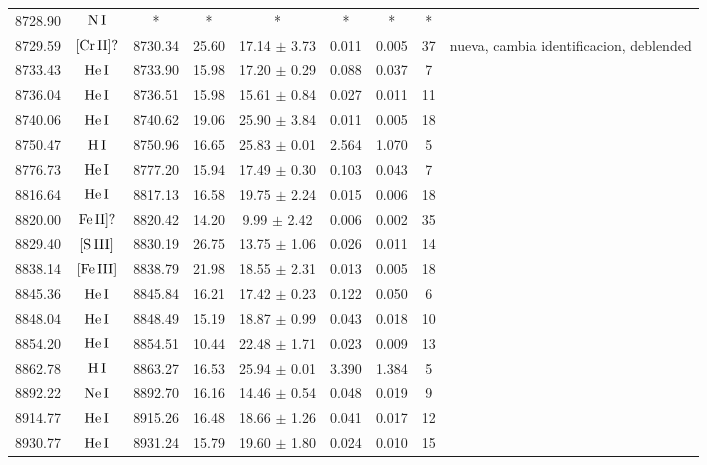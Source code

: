 \documentclass{article}
\begin{document}
\begin{table*}
\begin{adjustbox}{width=\textwidth}
\begin{tabular}{ccccccccc}
8728.90 & $\mbox{N}\thinspace \mbox{I}$ & * & * & * & * & * & * &  \\
8729.59 & $\mbox{[Cr}\thinspace \mbox{II]?}$ & 8730.34 & 25.60 & 17.14 $\pm$ 3.73 & 0.011 & 0.005 & 37 &  nueva, cambia identificacion, deblended \\
8733.43 & $\mbox{He}\thinspace \mbox{I}$ & 8733.90 & 15.98 & 17.20 $\pm$ 0.29 & 0.088 & 0.037 & 7 &  \\
8736.04 & $\mbox{He}\thinspace \mbox{I}$ & 8736.51 & 15.98 & 15.61 $\pm$ 0.84 & 0.027 & 0.011 & 11 &  \\
8740.06 & $\mbox{He}\thinspace \mbox{I}$ & 8740.62 & 19.06 & 25.90 $\pm$ 3.84 & 0.011 & 0.005 & 18 &  \\
8750.47 & $\mbox{H}\thinspace \mbox{I}$ & 8750.96 & 16.65 & 25.83 $\pm$ 0.01 & 2.564 & 1.070 & 5 &  \\
8776.73 & $\mbox{He}\thinspace \mbox{I}$ & 8777.20 & 15.94 & 17.49 $\pm$ 0.30 & 0.103 & 0.043 & 7 &  \\
8816.64 & $\mbox{He}\thinspace \mbox{I}$ & 8817.13 & 16.58 & 19.75 $\pm$ 2.24 & 0.015 & 0.006 & 18 &  \\
8820.00 & $\mbox{Fe}\thinspace \mbox{II]?}$ & 8820.42 & 14.20 & 9.99 $\pm$ 2.42 & 0.006 & 0.002 & 35 &  \\
8829.40 & $\mbox{[S}\thinspace \mbox{III]}$ & 8830.19 & 26.75 & 13.75 $\pm$ 1.06 & 0.026 & 0.011 & 14 &  \\
8838.14 & $\mbox{[Fe}\thinspace \mbox{III]}$ & 8838.79 & 21.98 & 18.55 $\pm$ 2.31 & 0.013 & 0.005 & 18 &  \\
8845.36 & $\mbox{He}\thinspace \mbox{I}$ & 8845.84 & 16.21 & 17.42 $\pm$ 0.23 & 0.122 & 0.050 & 6 &  \\
8848.04 & $\mbox{He}\thinspace \mbox{I}$ & 8848.49 & 15.19 & 18.87 $\pm$ 0.99 & 0.043 & 0.018 & 10 &  \\
8854.20 & $\mbox{He}\thinspace \mbox{I}$ & 8854.51 & 10.44 & 22.48 $\pm$ 1.71 & 0.023 & 0.009 & 13 &  \\
8862.78 & $\mbox{H}\thinspace \mbox{I}$ & 8863.27 & 16.53 & 25.94 $\pm$ 0.01 & 3.390 & 1.384 & 5 &  \\
8892.22 & $\mbox{Ne}\thinspace \mbox{I}$ & 8892.70 & 16.16 & 14.46 $\pm$ 0.54 & 0.048 & 0.019 & 9 &  \\
8914.77 & $\mbox{He}\thinspace \mbox{I}$ & 8915.26 & 16.48 & 18.66 $\pm$ 1.26 & 0.041 & 0.017 & 12 &  \\
8930.77 & $\mbox{He}\thinspace \mbox{I}$ & 8931.24 & 15.79 & 19.60 $\pm$ 1.80 & 0.024 & 0.010 & 15 &  \\

\end{tabular}
\end{adjustbox}
\end{table*}
\end{document}
